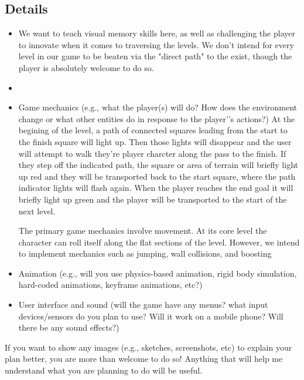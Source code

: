 \documentclass[11pt]{article}
\begin{document}
\subsection{Details}
\begin{itemize}
\item

We want to teach visual memory skills here, as well as challenging the player to innovate when it comes to traversing the levels. We don't intend for every level in our game to be beaten via the "direct path" to the exist, though the player is absolutely welcome to do so.

\item 
\item Game mechanics (e.g., what the player(s) will do? How does the environment change or what other entities do in response to the player’'s actions?)
At the begining of the level, a path of connected squares leading from the start to the finish square will light up. Then those lights will disappear and the user will attempt to walk they're player charcter along the pass to the finish. If they step off the indicated path, the square or area of terrain will briefly light up red and they will be transported back to the start square, where the path indicator lights will flash again. When the player reaches the end goal it will briefly light up green and the player will be transported to the start of the next level.

The primary game mechanics involve movement. At its core level the character can roll itself along the flat sections of the level. However, we intend to implement mechanics such as jumping, wall collisions, and boosting

\item Animation (e.g., will you use physics-based animation, rigid body simulation, hard-coded animations, keyframe animations, etc?)


\item User interface and sound (will the game have any menus? what input devices/sensors do you plan to use? Will it work on a mobile phone? Will there be any sound effects?)
\end{itemize}

If you want to show any images (e.g., sketches, screenshots, etc) to explain your plan better, you are more than welcome to do so! Anything that will help me understand what you are planning to do will be useful.  
\end{document}
